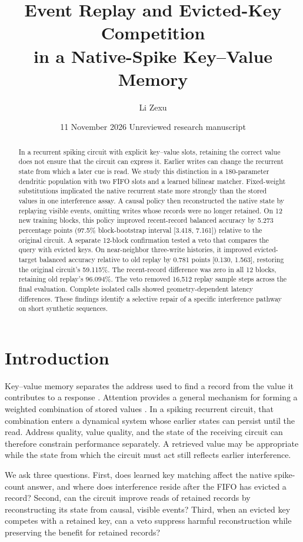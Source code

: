 \documentclass[10pt]{article}
\title{Event Replay and Evicted-Key Competition\\in a Native-Spike Key--Value Memory}
\author{Li Zexu}
\date{11 November 2026 \textbullet{} Unreviewed research manuscript}
\begin{document}
\maketitle

\begin{abstract}
In a recurrent spiking circuit with explicit key--value slots, retaining the correct value does not ensure that the circuit can express it. Earlier writes can change the recurrent state from which a later cue is read. We study this distinction in a 180-parameter dendritic population with two FIFO slots and a learned bilinear matcher. Fixed-weight substitutions implicated the native recurrent state more strongly than the stored values in one interference assay. A causal policy then reconstructed the native state by replaying visible events, omitting writes whose records were no longer retained. On 12 new training blocks, this policy improved recent-record balanced accuracy by 5.273 percentage points (97.5\% block-bootstrap interval [3.418, 7.161]) relative to the original circuit. A separate 12-block confirmation tested a veto that compares the query with evicted keys. On near-neighbor three-write histories, it improved evicted-target balanced accuracy relative to old replay by 0.781 points [0.130, 1.563], restoring the original circuit's 59.115\%. The recent-record difference was zero in all 12 blocks, retaining old replay's 96.094\%. The veto removed 16,512 replay sample steps across the final evaluation. Complete isolated calls showed geometry-dependent latency differences. These findings identify a selective repair of a specific interference pathway on short synthetic sequences.
\end{abstract}

\section{Introduction}
Key--value memory separates the address used to find a record from the value it contributes to a response \cite{miller2016}. Attention provides a general mechanism for forming a weighted combination of stored values \cite{vaswani2017}. In a spiking recurrent circuit, that combination enters a dynamical system whose earlier states can persist until the read. Address quality, value quality, and the state of the receiving circuit can therefore constrain performance separately. A retrieved value may be appropriate while the state from which the circuit must act still reflects earlier interference.

We ask three questions. First, does learned key matching affect the native spike-count answer, and where does interference reside after the FIFO has evicted a record? Second, can the circuit improve reads of retained records by reconstructing its state from causal, visible events? Third, when an evicted key competes with a retained key, can a veto suppress harmful reconstruction while preserving the benefit for retained records?
\end{document}
